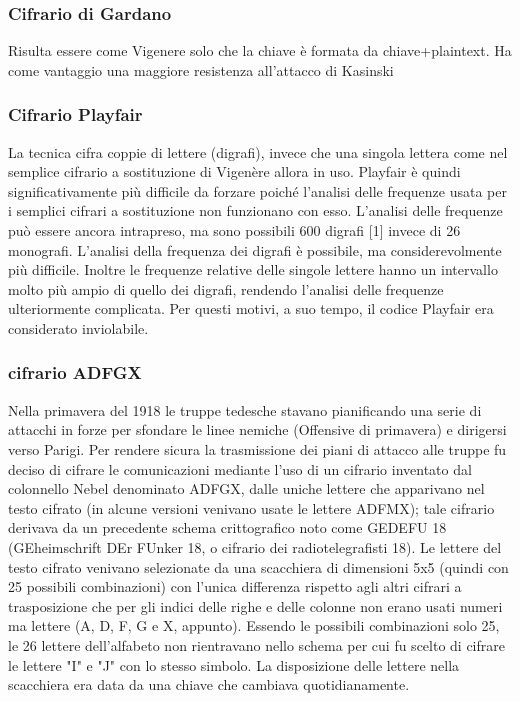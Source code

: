 \documentclass[10pt,a4paper]{article}
\begin{document}
\subsubsection{Cifrario di Gardano}
Risulta essere come Vigenere solo che la chiave è formata da chiave+plaintext. Ha come vantaggio una maggiore resistenza all'attacco di Kasinski

\subsubsection{Cifrario Playfair}
La tecnica cifra coppie di lettere (digrafi), invece che una singola lettera come nel semplice cifrario a sostituzione di Vigenère allora in uso. Playfair è quindi significativamente più difficile da forzare poiché l'analisi delle frequenze usata per i semplici cifrari a sostituzione non funzionano con esso. L'analisi delle frequenze può essere ancora intrapreso, ma sono possibili 600 digrafi [1] invece di 26 monografi. L'analisi della frequenza dei digrafi è possibile, ma considerevolmente più difficile. Inoltre le frequenze relative delle singole lettere hanno un intervallo molto più ampio di quello dei digrafi, rendendo l’analisi delle frequenze ulteriormente complicata. Per questi motivi, a suo tempo, il codice Playfair era considerato inviolabile.

\subsubsection{cifrario ADFGX}

Nella primavera del 1918 le truppe tedesche stavano pianificando una serie di attacchi in forze per sfondare le linee nemiche (Offensive di primavera) e dirigersi verso Parigi. Per rendere sicura la trasmissione dei piani di attacco alle truppe fu deciso di cifrare le comunicazioni mediante l'uso di un cifrario inventato dal colonnello Nebel denominato ADFGX, dalle uniche lettere che apparivano nel testo cifrato (in alcune versioni venivano usate le lettere ADFMX); tale cifrario derivava da un precedente schema crittografico noto come GEDEFU 18 (GEheimschrift DEr FUnker 18, o cifrario dei radiotelegrafisti 18). Le lettere del testo cifrato venivano selezionate da una scacchiera di dimensioni 5x5 (quindi con 25 possibili combinazioni) con l'unica differenza rispetto agli altri cifrari a trasposizione che per gli indici delle righe e delle colonne non erano usati numeri ma lettere (A, D, F, G e X, appunto). Essendo le possibili combinazioni solo 25, le 26 lettere dell'alfabeto non rientravano nello schema per cui fu scelto di cifrare le lettere "I" e "J" con lo stesso simbolo. La disposizione delle lettere nella scacchiera era data da una chiave che cambiava quotidianamente.
\end{document}
